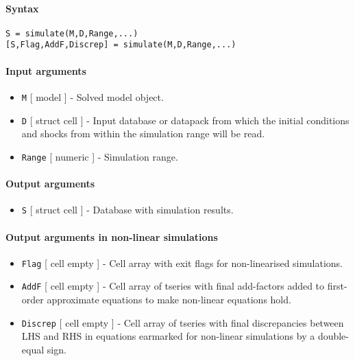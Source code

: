 


	\paragraph{Syntax}\label{syntax}

\begin{verbatim}
S = simulate(M,D,Range,...)
[S,Flag,AddF,Discrep] = simulate(M,D,Range,...)
\end{verbatim}

\paragraph{Input arguments}\label{input-arguments}

\begin{itemize}
\item
  \texttt{M} {[} model {]} - Solved model object.
\item
  \texttt{D} {[} struct \textbar{} cell {]} - Input database or datapack
  from which the initial conditions and shocks from within the
  simulation range will be read.
\item
  \texttt{Range} {[} numeric {]} - Simulation range.
\end{itemize}

\paragraph{Output arguments}\label{output-arguments}

\begin{itemize}
\itemsep1pt\parskip0pt
\item
  \texttt{S} {[} struct \textbar{} cell {]} - Database with simulation
  results.
\end{itemize}

\paragraph{Output arguments in non-linear
simulations}\label{output-arguments-in-non-linear-simulations}

\begin{itemize}
\item
  \texttt{Flag} {[} cell \textbar{} empty {]} - Cell array with exit
  flags for non-linearised simulations.
\item
  \texttt{AddF} {[} cell \textbar{} empty {]} - Cell array of tseries
  with final add-factors added to first-order approximate equations to
  make non-linear equations hold.
\item
  \texttt{Discrep} {[} cell \textbar{} empty {]} - Cell array of tseries
  with final discrepancies between LHS and RHS in equations earmarked
  for non-linear simulations by a double-equal sign.
\end{itemize}

